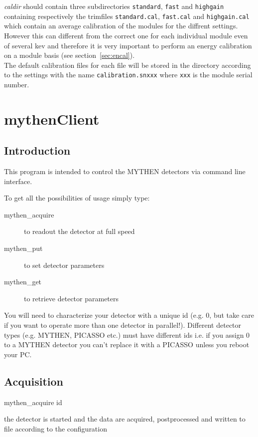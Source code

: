 \documentclass{report}
\begin{document}
\textit{caldir} should contain three subdirectories \verb=standard=,  \verb=fast= and  \verb=highgain= containing respectively the trimfiles \verb=standard.cal=,  \verb=fast.cal= and  \verb=highgain.cal= which contain an average calibration of the modules for the diffrent settings. However this can different from the correct one for each individual module even of several kev and therefore it is very important to perform an energy calibration on a module basis (see section~\ref{sec:encal}).\\
The default calibration files for each file will be stored in the directory according to the settings with the name \verb=calibration.snxxx= where \verb=xxx= is the module serial number.



\chapter{mythenClient}

\section{Introduction}

This program is intended to control the MYTHEN detectors via command line interface.

To get all the possibilities of usage simply type:
\begin{description}
\item[mythen\_acquire] to readout the detector at full speed
\item[mythen\_put] to set detector parameters
\item[mythen\_get] to retrieve detector parameters
\end{description}

You will need to characterize your detector with a unique id (e.g. 0, but take care if you want to operate more than one detector in parallel!). Different detector types (e.g. MYTHEN, PICASSO etc.) must have different ids i.e. if you assign 0 to a MYTHEN detector you can't replace it with a PICASSO unless you reboot your PC.

\section{Acquisition}
mythen\_acquire id

the detector is started and the data are acquired, postprocessed and written to file according to the configuration
\end{document}
